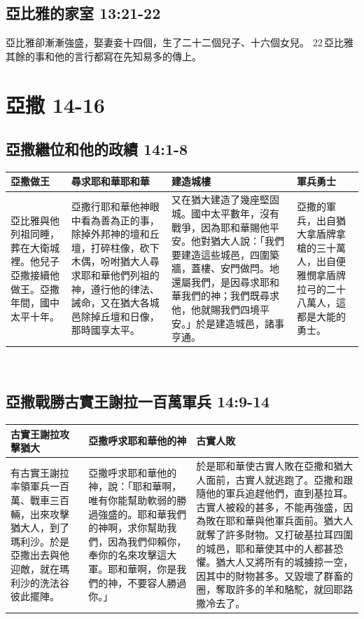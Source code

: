 \subsection{亞比雅的家室 13:21-22}
亞比雅卻漸漸強盛，娶妻妾十四個，生了二十二個兒子、十六個女兒。 22 亞比雅其餘的事和他的言行都寫在先知易多的傳上。




\section{亞撒 14-16 }
\subsection{亞撒繼位和他的政績 14:1-8}
\begin{table}[H]
\centering 
\begin{tabular}{p{2.35cm}|p{5.25cm}|p{6.55cm}|p{2.85cm}}\hline\hline
亞撒做王&尋求耶和華耶和華&建造城樓&軍兵勇士\\\hline\hline
亞比雅與他列祖同睡，葬在大衛城裡。他兒子亞撒接續他做王。亞撒年間，國中太平十年。
&亞撒行耶和華他神眼中看為善為正的事，除掉外邦神的壇和丘壇，打碎柱像，砍下木偶，吩咐猶大人尋求耶和華他們列祖的神，遵行他的律法、誡命，又在猶大各城邑除掉丘壇和日像，那時國享太平。
&又在猶大建造了幾座堅固城。國中太平數年，沒有戰爭，因為耶和華賜他平安。他對猶大人說：「我們要建造這些城邑，四圍築牆，蓋樓、安門做閂。地還屬我們，是因尋求耶和華我們的神；我們既尋求他，他就賜我們四境平安。」於是建造城邑，諸事亨通。&亞撒的軍兵，出自猶大拿盾牌拿槍的三十萬人，出自便雅憫拿盾牌拉弓的二十八萬人，這都是大能的勇士。\\\hline
\end{tabular}
\end{table}



 

\subsection{亞撒戰勝古實王謝拉一百萬軍兵 14:9-14}
\begin{table}[H]
\centering 
\begin{tabular}{p{3.5cm}|p{}|p{8.5cm}}\hline\hline
古實王謝拉攻擊猶大&亞撒呼求耶和華他的神&古實人敗\\\hline\hline
有古實王謝拉率領軍兵一百萬、戰車三百輛，出來攻擊猶大人，到了瑪利沙。於是亞撒出去與他迎敵，就在瑪利沙的洗法谷彼此擺陣。
&亞撒呼求耶和華他的神，說：「耶和華啊，唯有你能幫助軟弱的勝過強盛的。耶和華我們的神啊，求你幫助我們，因為我們仰賴你，奉你的名來攻擊這大軍。耶和華啊，你是我們的神，不要容人勝過你。」
&於是耶和華使古實人敗在亞撒和猶大人面前，古實人就逃跑了。亞撒和跟隨他的軍兵追趕他們，直到基拉耳。古實人被殺的甚多，不能再強盛，因為敗在耶和華與他軍兵面前。猶大人就奪了許多財物。又打破基拉耳四圍的城邑，耶和華使其中的人都甚恐懼。猶大人又將所有的城擄掠一空，因其中的財物甚多。又毀壞了群畜的圈，奪取許多的羊和駱駝，就回耶路撒冷去了。\\\hline
\end{tabular}
\end{table}


